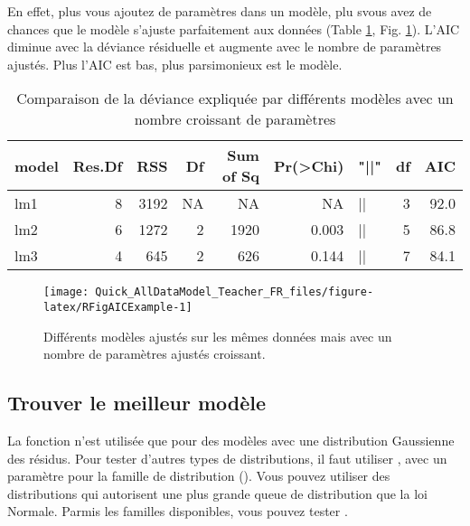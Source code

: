 \documentclass[french,a4paper]{article}
\begin{document}
En effet, plus vous ajoutez de paramètres dans un modèle, plu svous avez
de chances que le modèle s'ajuste parfaitement aux données (Table
\ref{tab:RTableAnovaEx}, Fig. \ref{fig:RFigAICExample}). L'AIC diminue
avec la déviance résiduelle et augmente avec le nombre de paramètres
ajustés. Plus l'AIC est bas, plus parsimonieux est le modèle.




\begin{table}

\caption{\label{tab:RTableAnovaEx}Comparaison de la déviance expliquée par différents modèles avec un nombre croissant de paramètres}
\centering
\begin{tabular}[t]{l|r|r|r|r|r|l|r|r}
\hline
model & Res.Df & RSS & Df & Sum of Sq & Pr(>Chi) & "||" & df & AIC\\
\hline
lm1 & 8 & 3192 & NA & NA & NA & || & 3 & 92.0\\
\hline
lm2 & 6 & 1272 & 2 & 1920 & 0.003 & || & 5 & 86.8\\
\hline
lm3 & 4 & 645 & 2 & 626 & 0.144 & || & 7 & 84.1\\
\hline
\end{tabular}
\end{table}

\begin{figure}[!h]

{\centering \texttt{[image: Quick\_AllDataModel\_Teacher\_FR\_files/figure-latex/RFigAICExample-1]} 

}

\caption{Différents modèles ajustés sur les mêmes données
mais avec un nombre de paramètres ajustés croissant.}\label{fig:RFigAICExample}
\end{figure}

\hypertarget{trouver-le-meilleur-modele}{%
\subsection{Trouver le meilleur
modèle}\label{trouver-le-meilleur-modele}}

La fonction  n'est utilisée que pour des modèles avec
une distribution Gaussienne des résidus. Pour tester d'autres types de
distributions, il faut utiliser , avec un paramètre
pour la famille de distribution (). Vous pouvez
utiliser des distributions qui autorisent une plus grande queue de
distribution que la loi Normale. Parmis les familles disponibles, vous
pouvez tester .
\end{document}
